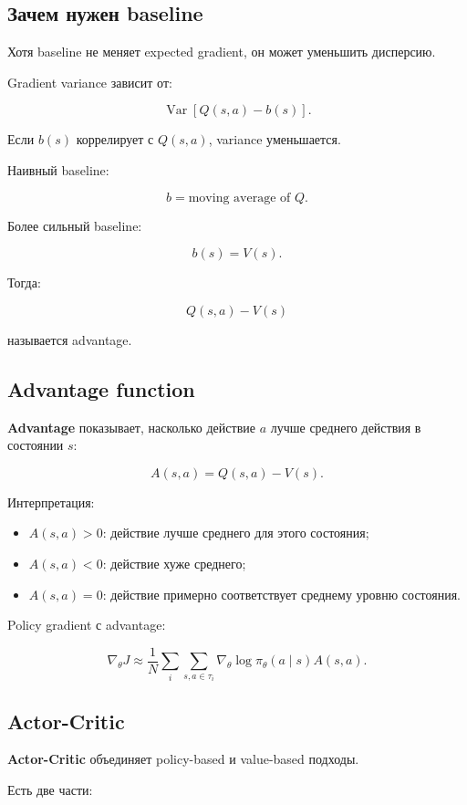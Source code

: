 \documentclass[a4paper,12pt]{article}
\begin{document}
\subsection{Зачем нужен baseline}

Хотя baseline не меняет expected gradient, он может уменьшить дисперсию.

Gradient variance зависит от:

\[
\operatorname{Var}[Q(s,a)-b(s)].
\]

Если \(b(s)\) коррелирует с \(Q(s,a)\), variance уменьшается.

Наивный baseline:

\[
b = \text{moving average of } Q.
\]

Более сильный baseline:

\[
b(s)=V(s).
\]

Тогда:

\[
Q(s,a)-V(s)
\]

называется advantage.

\subsection{Advantage function}

\textbf{Advantage} показывает, насколько действие \(a\) лучше среднего действия в состоянии \(s\):

\[
A(s,a)
=
Q(s,a)-V(s).
\]

Интерпретация:

\begin{itemize}
    \item \(A(s,a)>0\): действие лучше среднего для этого состояния;
    \item \(A(s,a)<0\): действие хуже среднего;
    \item \(A(s,a)=0\): действие примерно соответствует среднему уровню состояния.
\end{itemize}

Policy gradient с advantage:

\[
\nabla_\theta J
\approx
\frac{1}{N}
\sum_i
\sum_{s,a\in \tau_i}
\nabla_\theta
\log \pi_\theta(a\mid s)
A(s,a).
\]

\subsection{Actor-Critic}

\textbf{Actor-Critic} объединяет policy-based и value-based подходы.

Есть две части:
\end{document}
